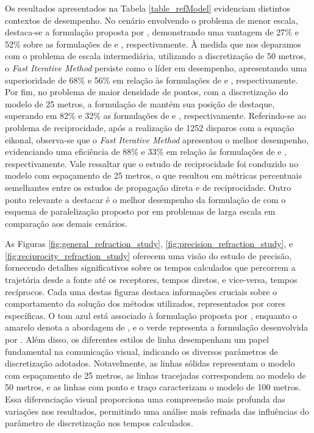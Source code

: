 Os resultados apresentados na Tabela \ref{table_refModel} evidenciam distintos contextos de desempenho. No cenário envolvendo o problema de menor escala, destaca-se a formulação proposta por , demonstrando uma vantagem de 27\% e 52\% sobre as formulações de  e , respectivamente. À medida que nos deparamos com o problema de escala intermediária, utilizando a discretização de 50 metros, o \textit{Fast Iterative Method} persiste como o líder em desempenho, apresentando uma superioridade de 68\% e 56\% em relação às formulações de  e , respectivamente. Por fim, no problema de maior densidade de pontos, com a discretização do modelo de 25 metros, a formulação de  mantém sua posição de destaque, superando em 82\% e 32\% as formulações de  e , respectivamente. Referindo-se ao problema de reciprocidade, após a realização de 1252 disparos com a equação eikonal, observa-se que o \textit{Fast Iterative Method} apresentou o melhor desempenho, evidenciando uma eficiência de 88\% e 33\% em relação às formulações de  e , respectivamente. Vale ressaltar que o estudo de reciprocidade foi conduzido no modelo com espaçamento de 25 metros, o que resultou em métricas percentuais semelhantes entre os estudos de propagação direta e de reciprocidade. Outro ponto relevante a destacar é o melhor desempenho da formulação de  com o esquema de paralelização proposto por  em problemas de larga escala em comparação aos demais cenários.

As Figuras \ref{fig:general_refraction_study}, \ref{fig:precision_refraction_study}, e \ref{fig:reciprocity_refraction_study} oferecem uma visão do estudo de precisão, fornecendo detalhes significativos sobre os tempos calculados que percorrem a trajetória desde a fonte até os receptores, tempos diretos, e vice-versa, tempos recíprocos. Cada uma destas figuras destaca informações cruciais sobre o comportamento da solução dos métodos utilizados, representados por cores específicas. O tom azul está associado à formulação proposta por , enquanto o amarelo denota a abordagem de , e o verde representa a formulação desenvolvida por . Além disso, os diferentes estilos de linha desempenham um papel fundamental na comunicação visual, indicando os diversos parâmetros de discretização adotados. Notavelmente, as linhas sólidas representam o modelo com espaçamento de 25 metros, as linhas tracejadas correspondem ao modelo de 50 metros, e as linhas com ponto e traço caracterizam o modelo de 100 metros. Essa diferenciação visual proporciona uma compreensão mais profunda das variações nos resultados, permitindo uma análise mais refinada das influências do parâmetro de discretização nos tempos calculados. 

